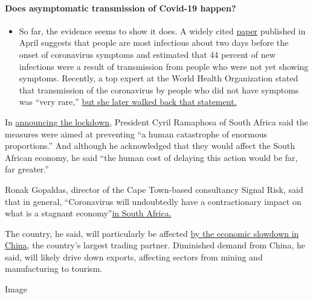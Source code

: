 \begin{itemize}
{  \paragraph{Does asymptomatic transmission of Covid-19
  happen?}\label{does-asymptomatic-transmission-of-covid-19-happen}}

  \begin{itemize}
  \tightlist
  \item
    So far, the evidence seems to show it does. A widely cited
    \href{https://www.nature.com/articles/s41591-020-0869-5}{paper}
    published in April suggests that people are most infectious about
    two days before the onset of coronavirus symptoms and estimated that
    44 percent of new infections were a result of transmission from
    people who were not yet showing symptoms. Recently, a top expert at
    the World Health Organization stated that transmission of the
    coronavirus by people who did not have symptoms was ``very rare,''
    \href{https://www.nytimes.com/2020/06/09/world/coronavirus-updates.html?action=click\&pgtype=Article\&state=default\&region=MAIN_CONTENT_3\&context=storylines_faq\#link-1f302e21}{but
    she later walked back that statement.}
  \end{itemize}
\end{itemize}

In
\href{http://www.thepresidency.gov.za/speeches/statement-president-cyril-ramaphosa-escalation-measures-combat-covid-19-epidemic\%2C-union}{announcing
the lockdown}, President Cyril Ramaphosa of South Africa said the
measures were aimed at preventing ``a human catastrophe of enormous
proportions.'' And although he acknowledged that they would affect the
South African economy, he said ``the human cost of delaying this action
would be far, far greater.''

Ronak Gopaldas, director of the Cape Town-based consultancy Signal Risk,
said that in general, ``Coronavirus will undoubtedly have a
contractionary impact on what is a stagnant
economy''\href{https://www.businessinsider.co.za/south-african-economy-in-deep-trouble-2020-2}{in
South Africa.}

The country, he said, will particularly be affected
\href{https://www.nytimes.com/2020/03/16/business/coronavirus-china-economy.html}{by
the economic slowdown in China}, the country's largest trading partner.
Diminished demand from China, he said, will likely drive down exports,
affecting sectors from mining and manufacturing to tourism.

Image

